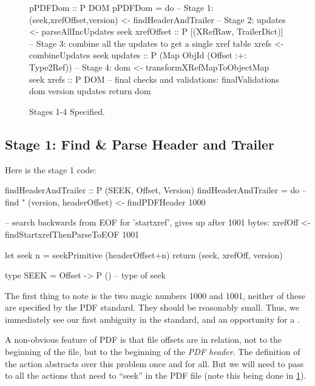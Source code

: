 \begin{figure}[t]
\centering
\lstset{numbers=right}
\begin{code}
pPDFDom :: P DOM
pPDFDom =
    do
    -- Stage 1:
    (seek,xrefOffset,version) <- findHeaderAndTrailer
    -- Stage 2:
    updates <- parseAllIncUpdates seek xrefOffset
               :: P [(XRefRaw, TrailerDict)]
    -- Stage 3: combine all the updates to get a single xref table
    xrefs <- combineUpdates seek updates
             :: P (Map ObjId (Offset :+: Type2Ref))
    -- Stage 4:
    dom <- transformXRefMapToObjectMap seek xrefs
           :: P DOM
    -- final checks and validations:
    finalValidations dom version updates
    return dom
\end{code}
\caption{Stages 1-4 Specified.}
\label{fig:spec}
\end{figure}


\subsection{Stage 1: Find \& Parse Header and Trailer}

Here is the stage 1 code:
\begin{code}
findHeaderAndTrailer :: P (SEEK, Offset, Version)
findHeaderAndTrailer =
    do
    -- find "%
    (version, headerOffset) <- findPDFHeader 1000

    -- search backwards from EOF for 'startxref', gives up after 1001 bytes:
    xrefOff <- findStartxrefThenParseToEOF 1001
    
    let seek n = seekPrimitive (headerOffset+n)
    return (seek, xrefOff, version)
    
type SEEK = Offset -> P () -- type of seek
\end{code}

The first thing to note is the two magic numbers 1000 and 1001, neither of
these are specified by the PDF standard. They should be reasonably
small.  Thus, we immediately see our first ambiguity in the standard,
and an opportunity for a \pd{}.

A non-obvious feature of PDF is that file offsets are in relation, not
to the beginning of the file, but to the beginning of the \emph{PDF header}.
%
The definition of the action  abstracts over this problem once and for all.
But we will need to pass  to all the actions that need to
``seek'' in the PDF file (note this being done in \cref{fig:spec}).

